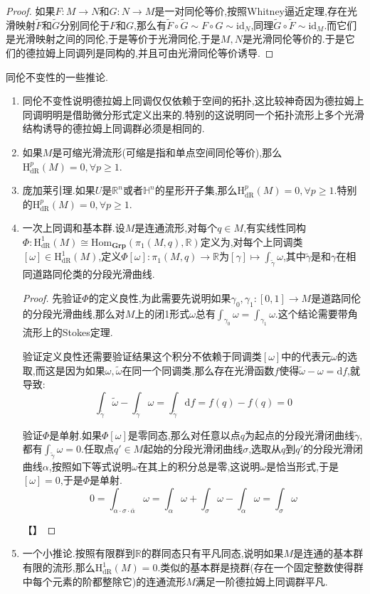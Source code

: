 \begin{enumerate}
\begin{proof}
    	如果$F:M\to N$和$G:N\to M$是一对同伦等价,按照Whitney逼近定理,存在光滑映射$\widetilde{F}$和$\widetilde{G}$分别同伦于$F$和$G$,那么有$\widetilde{F}\circ\widetilde{G}\sim F\circ G\sim\mathrm{id}_N$,同理$\widetilde{G}\circ\widetilde{F}\sim\mathrm{id}_M$.而它们是光滑映射之间的同伦,于是等价于光滑同伦,于是$M,N$是光滑同伦等价的.于是它们的德拉姆上同调列是同构的,并且可由光滑同伦等价诱导.
    \end{proof}
\end{enumerate}

同伦不变性的一些推论.
\begin{enumerate}
	\item 同伦不变性说明德拉姆上同调仅仅依赖于空间的拓扑,这比较神奇因为德拉姆上同调明明是借助微分形式定义出来的.特别的这说明同一个拓扑流形上多个光滑结构诱导的德拉姆上同调群必须是相同的.
	\item 如果$M$是可缩光滑流形(可缩是指和单点空间同伦等价),那么$\mathrm{H}^p_{\mathrm{dR}}(M)=0,\forall p\ge1$.
	\item 庞加莱引理.如果$U$是$\mathbb{R}^n$或者$\mathbb{H}^n$的星形开子集,那么$\mathrm{H}^p_{\mathrm{dR}}(M)=0,\forall p\ge1$.特别的$\mathrm{H}^p_{\mathrm{dR}}(M)=0,\forall p\ge1$.
	\item 一次上同调和基本群.设$M$是连通流形,对每个$q\in M$,有实线性同构$\Phi:\mathrm{H}^1_{\mathrm{dR}}(M)\cong\mathrm{Hom}_{\textbf{Grp}}(\pi_1(M,q),\mathbb{R})$定义为,对每个上同调类$[\omega]\in\mathrm{H}^1_{\mathrm{dR}}(M)$,定义$\Phi[\omega]:\pi_1(M,q)\to\mathbb{R}$为$[\gamma]\mapsto\int_{\widetilde{\gamma}}\omega$,其中$\widetilde{\gamma}$是和$\gamma$在相同道路同伦类的分段光滑曲线.
	\begin{proof}
		
		先验证$\Phi$的定义良性,为此需要先说明如果$\gamma_0,\gamma_1:[0,1]\to M$是道路同伦的分段光滑曲线,那么对$M$上的闭1形式$\omega$总有$\int_{\gamma_0}\omega=\int_{\gamma_1}\omega$.这个结论需要带角流形上的Stokes定理.
		
		验证定义良性还需要验证结果这个积分不依赖于同调类$[\omega]$中的代表元$\omega$的选取,而这是因为如果$\omega,\widetilde{\omega}$在同一个同调类,那么存在光滑函数$f$使得$\widetilde{\omega}-\omega=\mathrm{d}f$,就导致:
		$$\int_{\widetilde{\gamma}}\widetilde{\omega}-\int_{\widetilde{\gamma}}\omega=\int_{\widetilde{\gamma}}\mathrm{d}f=f(q)-f(q)=0$$
		
		验证$\Phi$是单射.如果$\Phi[\omega]$是零同态,那么对任意以点$q$为起点的分段光滑闭曲线$\widetilde{\gamma}$,都有$\int_{\widetilde{\gamma}}\omega=0$.任取点$q'\in M$起始的分段光滑闭曲线$\sigma$,选取从$q$到$q'$的分段光滑闭曲线$\alpha$,按照如下等式说明$\omega$在其上的积分总是零,这说明$\omega$是恰当形式,于是$[\omega]=0$,于是$\Phi$是单射.
		$$0=\int_{\alpha\cdot\sigma\cdot\overline{\alpha}}\omega=\int_{\alpha}\omega+\int_{\sigma}\omega-\int_{\alpha}\omega=\int_{\sigma}\omega$$
		
		【】
	\end{proof}
    \item 一个小推论.按照有限群到$\mathbb{R}$的群同态只有平凡同态,说明如果$M$是连通的基本群有限的流形,那么$\mathrm{H}^1_{\mathrm{dR}}(M)=0$.类似的基本群是挠群(存在一个固定整数使得群中每个元素的阶都整除它)的连通流形$M$满足一阶德拉姆上同调群平凡.
\end{enumerate}

